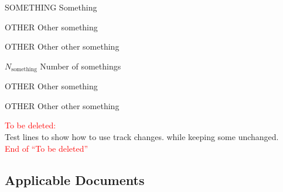 \documentclass[11pt,a4paper]{article}
\begin{document}
\sdpfrontpage

\sdptableofcontents

\sdplistoffigures

\sdplistoftables


\sdplistofabbreviations
\begin{basedescript}{\desclabelstyle{\pushlabel}\desclabelwidth{6em}}
    \item[SOMETHING] Something \vspace{-0.2cm}
    \item[OTHER] Other something \vspace{-0.2cm}
    \item[OTHER] Other other something \vspace{-0.2cm}
\end{basedescript} 

\sdplistofsymbols
\begin{basedescript}{\desclabelstyle{\pushlabel}\desclabelwidth{6em}}
    \item[$N_\mathrm{something}$] Number of somethings \vspace{-0.2cm}
    \item[OTHER] Other something \vspace{-0.2cm}
    \item[OTHER] Other other something \vspace{-0.2cm}
\end{basedescript} 



\sdpsummary

\textcolor{red}{To be deleted:}\\
Test lines to show how to use track changes. 
 while keeping some unchanged.
\\
\textcolor{red}{End of ``To be deleted''}

\sdpreferencedocs

\subsection*{Applicable Documents}
\end{document}
